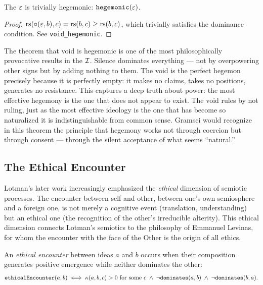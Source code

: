 \begin{theorem}
\label{thm:void-hegemonic}
The $\varepsilon$ is trivially hegemonic: $\texttt{hegemonic}(\varepsilon)$.
\end{theorem}

\begin{proof}
$\mathrm{rs}(\circ(\varepsilon, b), c) = \mathrm{rs}(b, c) \geq \mathrm{rs}(b, c)$, which
trivially satisfies the dominance condition. See
\texttt{void\_hegemonic}.
\end{proof}

\begin{interpretation}
The theorem that void is hegemonic is one of the most philosophically
provocative results in the $\mathcal{I}$. Silence dominates everything ---
not by overpowering other signs but by adding nothing to them. The
void is the perfect hegemon precisely because it is perfectly empty:
it makes no claims, takes no positions, generates no resistance. This
captures a deep truth about power: the most effective hegemony is the
one that does not appear to exist. The void rules by not ruling, just
as the most effective ideology is the one that has become so naturalized
it is indistinguishable from common sense. Gramsci would recognize
in this theorem the principle that hegemony works not through coercion
but through consent --- through the silent acceptance of what seems
``natural.''
\end{interpretation}

\subsection{The Ethical Encounter}

Lotman's later work increasingly emphasized the \emph{ethical}
dimension of semiotic processes. The encounter between self and other,
between one's own semiosphere and a foreign one, is not merely a
cognitive event (translation, understanding) but an ethical one (the
recognition of the other's irreducible alterity). This ethical
dimension connects Lotman's semiotics to the philosophy of Emmanuel
Levinas, for whom the encounter with the face of the Other is the
origin of all ethics.

\begin{definition}
\label{def:ethical-encounter}
An \emph{ethical encounter} between ideas $a$ and $b$ occurs when
their composition generates positive emergence while neither dominates
the other:
\[
  \texttt{ethicalEncounter}(a, b) \iff
  \kappa(a, b, c) > 0 \text{ for some } c \;\wedge\;
  \neg\texttt{dominates}(a, b) \;\wedge\;
  \neg\texttt{dominates}(b, a).
\]
\end{definition}

